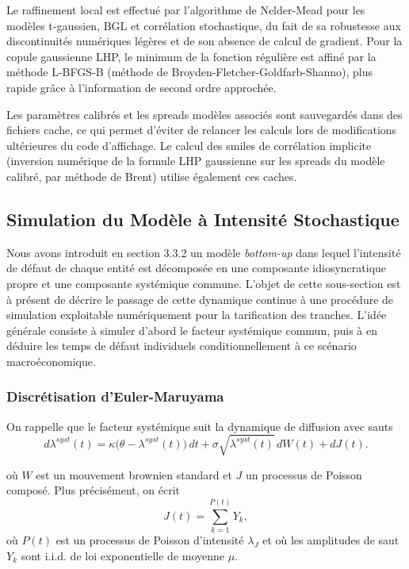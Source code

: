 Le raffinement local est effectué par l'algorithme de Nelder-Mead pour les modèles t-gaussien,
BGL et corrélation stochastique, du fait de sa robustesse aux discontinuités numériques légères
et de son absence de calcul de gradient. Pour la copule gaussienne LHP, le minimum de la fonction
régulière est affiné par la méthode L-BFGS-B (méthode de Broyden-Fletcher-Goldfarb-Shanno), plus rapide grâce à l'information de second ordre
approchée.

Les paramètres calibrés et les spreads modèles associés sont sauvegardés dans des fichiers
cache, ce qui permet d'éviter de relancer les calculs lors de modifications ultérieures du code
d'affichage. Le calcul des smiles de corrélation implicite (inversion numérique de la formule
LHP gaussienne sur les spreads du modèle calibré, par méthode de Brent) utilise également
ces caches.

\subsection{Simulation du Modèle à Intensité Stochastique}

Nous avons introduit en section 3.3.2 un modèle \textit{bottom-up} dans lequel l'intensité de défaut de chaque entité est décomposée en une composante idiosyncratique propre et une composante systémique commune. L'objet de cette sous-section est à présent de décrire le passage de cette dynamique continue à une procédure de simulation exploitable numériquement pour la tarification des tranches. L'idée générale consiste à simuler d'abord le facteur systémique commun, puis à en déduire les temps de défaut individuels conditionnellement à ce scénario macroéconomique.

\subsubsection{Discrétisation d'Euler-Maruyama}

On rappelle que le facteur systémique suit la dynamique de diffusion avec sauts
\begin{equation}
d\lambda^{syst}(t)=\kappa\bigl(\theta-\lambda^{syst}(t)\bigr)\,dt+\sigma\sqrt{\lambda^{syst}(t)}\,dW(t)+dJ(t).
\end{equation}

où $W$ est un mouvement brownien standard et $J$ un processus de Poisson composé. Plus précisément, on écrit
\begin{equation}
J(t)=\sum_{k=1}^{P(t)} Y_k,
\end{equation}
où $P(t)$ est un processus de Poisson d'intensité $\lambda_J$ et où les amplitudes de saut $Y_k$ sont i.i.d. de loi exponentielle de moyenne $\mu$.

